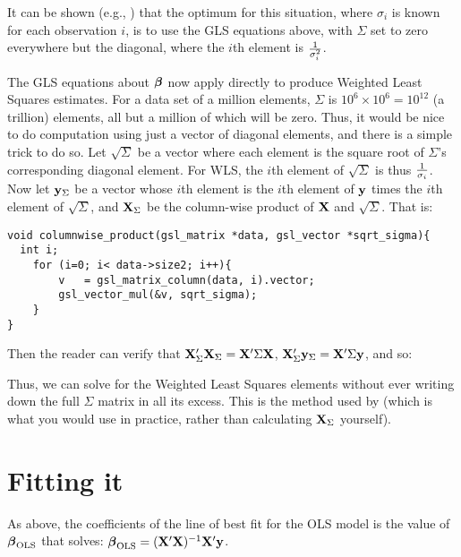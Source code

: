 It can be shown (e.g., \citet{kmenta}) that the optimum for this
situation, where $\sigma_i$ is known for each observation $i$, is to use
the GLS equations above, with $\Sigma$ set to zero everywhere but the
diagonal, where the $i$th element is $1\over {\sigma_i^2}$.

The GLS equations about ${\mbox{\boldmath$\beta$}}$ now apply directly to produce Weighted 
Least Squares estimates. For a data set of a million elements,
$\Sigma$ is $10^6 \times 10^6=10^{12}$ (a trillion) elements, all but a
million of which will be zero. Thus, it would be nice to do computation
using just a vector of diagonal elements, and there is a simple trick to
do so. Let $\sqrt\Sigma$ be a vector where each element is the square
root of $\Sigma$'s corresponding diagonal element. For WLS, the $i$th
element of $\sqrt\Sigma$ is thus $1\over {\sigma_i}$. Now let
${\bf y}_\Sigma$ be a vector whose $i$th element 
is the $i$th element of ${\bf y}$ times the $i$th element of
$\sqrt\Sigma$, and 
${\bf X}_\Sigma$ be the column-wise product of ${\bf X}$ and
$\sqrt\Sigma$. That is:
\begin{lstlisting}
void columnwise_product(gsl_matrix *data, gsl_vector *sqrt_sigma){
  int i;
    for (i=0; i< data->size2; i++){
        v   = gsl_matrix_column(data, i).vector;
        gsl_vector_mul(&v, sqrt_sigma);
    }
}
\end{lstlisting}
Then the reader can verify that 
${\bf X}_\Sigma'{\bf X}_\Sigma = {\bf X}' \Sigma {\bf X}$, 
${\bf X}_\Sigma'{\bf y}_\Sigma = {\bf X}' \Sigma {\bf y}$, and so:


Thus, we can solve for the Weighted Least Squares elements without ever
writing down the full $\Sigma$ matrix in all its excess. This is the
method used by  (which is what you would use in
practice, rather than calculating ${\bf X}_\Sigma$ yourself).

\section{Fitting it} 
As above,
the coefficients of  the line of best fit for the OLS model is the value of ${\mbox{\boldmath$\beta$}}_{\rm OLS}$ that solves:
$ {\mbox{\boldmath$\beta$}}_{\rm OLS} = ({\bf X}'{\bf X})^{-1}{\bf X}'{\bf y}$.

